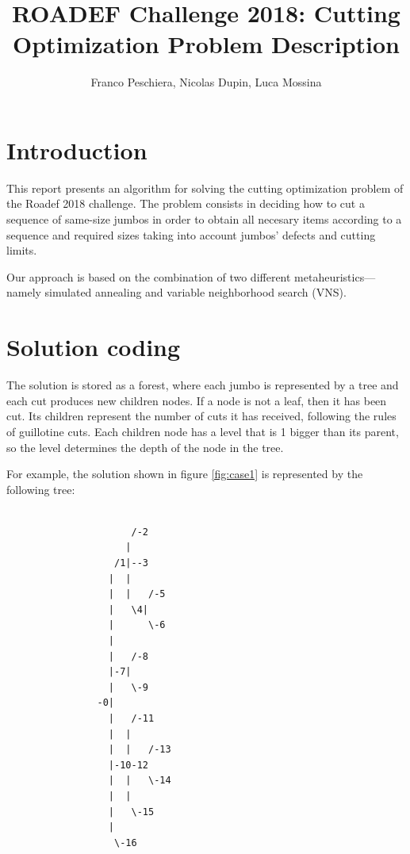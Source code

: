 \documentclass{roadef}
\begin{document}
\title{ROADEF Challenge 2018: Cutting Optimization Problem Description}


\author{Franco Peschiera, Nicolas Dupin, Luca Mossina}




\maketitle
\thispagestyle{empty}

\section{Introduction}

This report presents an algorithm for solving the cutting optimization problem of the Roadef 2018 challenge.
The problem consists in deciding how to cut a sequence of same-size jumbos in order to obtain all necesary items according to a sequence and required sizes taking into account jumbos' defects and cutting limits.

Our approach is based on the combination of two different metaheuristics—namely simulated annealing
and variable neighborhood search (VNS). 


\section{Solution coding}

        The solution is stored as a forest, where each jumbo is represented by a tree and each cut produces new children nodes. If a node is not a leaf, then it has been cut. Its children represent the number of cuts it has received, following the rules of guillotine cuts.
        Each children node has a level that is 1 bigger than its parent, so the level determines the depth of the node in the tree.

        For example, the solution shown in figure \ref{fig:case1} is represented by the following tree:

        \begin{tiny}
        \begin{verbatim}

                      /-2
                     |
                   /1|--3
                  |  |
                  |  |   /-5
                  |   \4|
                  |      \-6
                  |
                  |   /-8
                  |-7|
                  |   \-9
                -0|
                  |   /-11
                  |  |
                  |  |   /-13
                  |-10-12
                  |  |   \-14
                  |  |
                  |   \-15
                  |
                   \-16

        \end{verbatim}
        \end{tiny}
\end{document}
